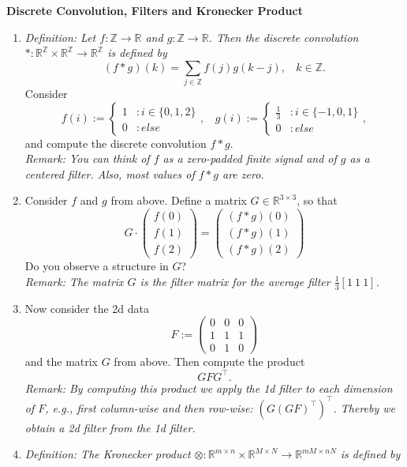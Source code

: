 \textbf{Discrete Convolution, Filters and Kronecker Product}
\begin{enumerate}
	\item \textit{\color{navy}Definition: Let $f\colon\mathbb{Z}\to\mathbb{R}$ and $g\colon\mathbb{Z}\to\mathbb{R}$. Then the discrete convolution $\ast\colon \mathbb{R}^\mathbb{Z}\times \mathbb{R}^\mathbb{Z} \to \mathbb{R}^\mathbb{Z}$ is defined by 
	$$ (f \ast g)(k)  = \sum_{j\in \mathbb{Z}}f(j)g(k-j),~~~~k\in \mathbb{Z}. $$}
	Consider 
	$$
	f(i) := \begin{cases}
	1 &: i \in \{0,1,2\}\\
	0 &: else
	\end{cases},~~~~
	g(i) := \begin{cases}
	\tfrac{1}{3} &: i \in \{-1,0,1\}\\
	0 &: else
	\end{cases},
	$$
	and compute the discrete convolution $f \ast g$.\\
	\textit{Remark: You can think of $f$ as a zero-padded finite signal and of $g$ as a centered filter. Also, most values of $f \ast g$ are zero.}
	\item Consider $f$ and $g$ from above. Define a matrix $G \in \mathbb{R}^{3\times 3}$, so that 
	$$
	G \cdot \begin{pmatrix}
	f(0)\\f(1)\\f(2)
	\end{pmatrix} 
	=
	\begin{pmatrix}
	(f \ast g)(0)\\(f \ast g)(1)\\(f \ast g)(2)
	\end{pmatrix}
	$$
	Do you observe a structure in $G$?\\
	\textit{Remark: The matrix $G$ is the filter matrix for the average filter $\tfrac{1}{3}[1~ 1~ 1]$.}
	\item Now consider the 2d data
	 $$F := \begin{pmatrix}
	 0 & 0 & 0\\1 & 1 & 1\\ 0 & 1 & 0
	 \end{pmatrix} $$
	 and the matrix $G$ from above. Then compute the product
	 $$G F G^\top. $$
	 \textit{Remark: By computing this product we apply the 1d filter to each dimension of $F$, e.g., first column-wise and then row-wise: $(G(GF)^\top)^\top$. Thereby we obtain a 2d filter from the 1d filter.}
	 \item \textit{\color{navy}Definition: The Kronecker product $\otimes\colon \mathbb{R}^{m \times n} \times \mathbb{R}^{M \times N} \to \mathbb{R}^{mM \times nN}$ is defined by
}
\end{enumerate}

